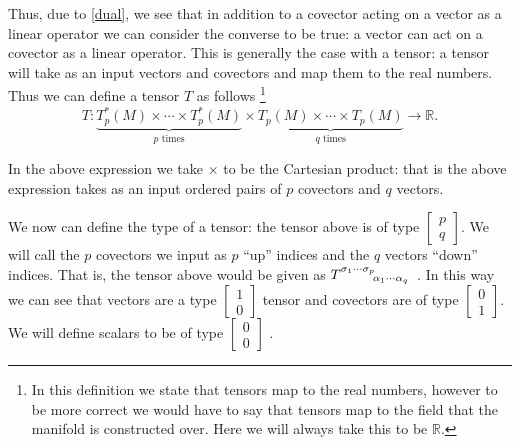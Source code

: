 Thus, due to \ref{dual}, we see that in addition to a covector acting on a vector as a linear operator we can consider the converse to be true: a vector can act on a covector as a linear operator. This is generally the case with a tensor: a tensor will take as an input vectors and covectors and map them to the real numbers. Thus we can define a tensor \(T\) as follows \footnote{In this definition we state that tensors map to the real numbers, however to be more correct we would have to say that tensors map to the field that the manifold is constructed over. Here we will always take this to be \(\mathbb{R}\).} \cite{carroll, szekeres}
\begin{equation} \label{tensor-def}
	T : \underbrace{T_{p}^{*}(M) \times \cdots \times T_{p}^{*}(M)}_{p \,\, \text{times}} \times \underbrace{T_{p}(M) \times \cdots \times T_{p}(M)}_{q \,\, \text{times}} \rightarrow \mathbb{R} .
\end{equation} 

In the above expression we take \(\times\) to be the Cartesian product: that is the above expression takes as an input ordered pairs of \(p\) covectors and \(q\) vectors.

We now can define the type of a tensor: the tensor above is of type \( \left[ \begin{smallmatrix} p \\ q \end{smallmatrix} \right] \). We will call the \(p\) covectors we input as \(p\) ``up'' indices and the \(q\) vectors ``down'' indices. That is, the tensor above would be given as \(T\indices{^{\sigma_{1}}^\cdots^{\sigma_{p}}_{\alpha_{1}}_\cdots_{\alpha_{q}}}\) \cite{carroll}. In this way we can see that vectors are a type \( \left[ \begin{smallmatrix} 1 \\ 0 \end{smallmatrix} \right] \) tensor and covectors are of type \( \left[ \begin{smallmatrix} 0 \\ 1 \end{smallmatrix} \right] \). We will define scalars to be of type \( \left[ \begin{smallmatrix} 0 \\ 0 \end{smallmatrix} \right] \) \cite{szekeres}. 

